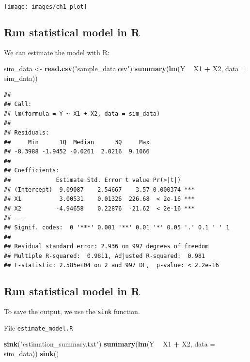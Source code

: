 \documentclass[]{book}
\newenvironment{Shaded}{\begin{snugshade}}{\end{snugshade}}
\newcommand{\KeywordTok}[1]{\textcolor[rgb]{0.13,0.29,0.53}{\textbf{#1}}}
\newcommand{\DataTypeTok}[1]{\textcolor[rgb]{0.13,0.29,0.53}{#1}}
\newcommand{\StringTok}[1]{\textcolor[rgb]{0.31,0.60,0.02}{#1}}
\newcommand{\OperatorTok}[1]{\textcolor[rgb]{0.81,0.36,0.00}{\textbf{#1}}}
\newcommand{\NormalTok}[1]{#1}
\theoremstyle{definition}
\theoremstyle{definition}
\theoremstyle{definition}
\theoremstyle{remark}
\begin{document}
\texttt{[image: images/ch1\_plot]}

\subsection{Run statistical model in
R}\label{run-statistical-model-in-r}

We can estimate the model with R:

\begin{Shaded}
\begin{Highlighting}[]
\NormalTok{sim_data <-}\StringTok{ }\KeywordTok{read.csv}\NormalTok{(}\StringTok{"sample_data.csv"}\NormalTok{)}
\KeywordTok{summary}\NormalTok{(}\KeywordTok{lm}\NormalTok{(Y }\OperatorTok{~}\StringTok{ }\NormalTok{X1 }\OperatorTok{+}\StringTok{ }\NormalTok{X2, }\DataTypeTok{data =}\NormalTok{ sim_data))}
\end{Highlighting}
\end{Shaded}

\begin{verbatim}
## 
## Call:
## lm(formula = Y ~ X1 + X2, data = sim_data)
## 
## Residuals:
##     Min      1Q  Median      3Q     Max 
## -8.3988 -1.9452 -0.0261  2.0216  9.1066 
## 
## Coefficients:
##             Estimate Std. Error t value Pr(>|t|)    
## (Intercept)  9.09087    2.54667    3.57 0.000374 ***
## X1           3.00531    0.01326  226.68  < 2e-16 ***
## X2          -4.94658    0.22876  -21.62  < 2e-16 ***
## ---
## Signif. codes:  0 '***' 0.001 '**' 0.01 '*' 0.05 '.' 0.1 ' ' 1
## 
## Residual standard error: 2.936 on 997 degrees of freedom
## Multiple R-squared:  0.9811, Adjusted R-squared:  0.981 
## F-statistic: 2.585e+04 on 2 and 997 DF,  p-value: < 2.2e-16
\end{verbatim}

\subsection{Run statistical model in
R}\label{run-statistical-model-in-r-1}

To save the output, we use the \texttt{sink} function.

File \texttt{estimate\_model.R}

\begin{Shaded}
\begin{Highlighting}[]
\KeywordTok{sink}\NormalTok{(}\StringTok{"estimation_summary.txt"}\NormalTok{)}
\KeywordTok{summary}\NormalTok{(}\KeywordTok{lm}\NormalTok{(Y }\OperatorTok{~}\StringTok{ }\NormalTok{X1 }\OperatorTok{+}\StringTok{ }\NormalTok{X2, }\DataTypeTok{data =}\NormalTok{ sim_data))}
\KeywordTok{sink}\NormalTok{()}
\end{Highlighting}
\end{Shaded}
\end{document}
